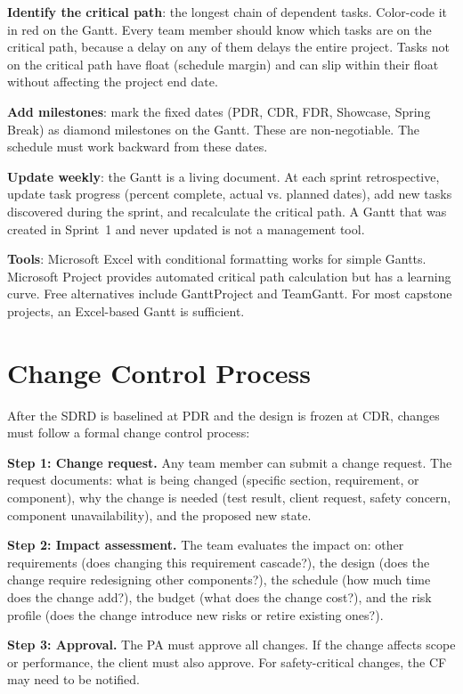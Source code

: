 \textbf{Identify the critical path}: the longest chain of dependent tasks. Color-code it in red on the Gantt. Every team member should know which tasks are on the critical path, because a delay on any of them delays the entire project. Tasks not on the critical path have float (schedule margin) and can slip within their float without affecting the project end date.

\textbf{Add milestones}: mark the fixed dates (PDR, CDR, FDR, Showcase, Spring Break) as diamond milestones on the Gantt. These are non-negotiable. The schedule must work backward from these dates.

\textbf{Update weekly}: the Gantt is a living document. At each sprint retrospective, update task progress (percent complete, actual vs. planned dates), add new tasks discovered during the sprint, and recalculate the critical path. A Gantt that was created in Sprint~1 and never updated is not a management tool.

\textbf{Tools}: Microsoft Excel with conditional formatting works for simple Gantts. Microsoft Project provides automated critical path calculation but has a learning curve. Free alternatives include GanttProject and TeamGantt. For most capstone projects, an Excel-based Gantt is sufficient.



\section{Change Control Process}
After the SDRD is baselined at PDR and the design is frozen at CDR, changes must follow a formal change control process:

\textbf{Step 1: Change request.} Any team member can submit a change request. The request documents: what is being changed (specific section, requirement, or component), why the change is needed (test result, client request, safety concern, component unavailability), and the proposed new state.

\textbf{Step 2: Impact assessment.} The team evaluates the impact on: other requirements (does changing this requirement cascade?), the design (does the change require redesigning other components?), the schedule (how much time does the change add?), the budget (what does the change cost?), and the risk profile (does the change introduce new risks or retire existing ones?).

\textbf{Step 3: Approval.} The PA must approve all changes. If the change affects scope or performance, the client must also approve. For safety-critical changes, the CF may need to be notified.

